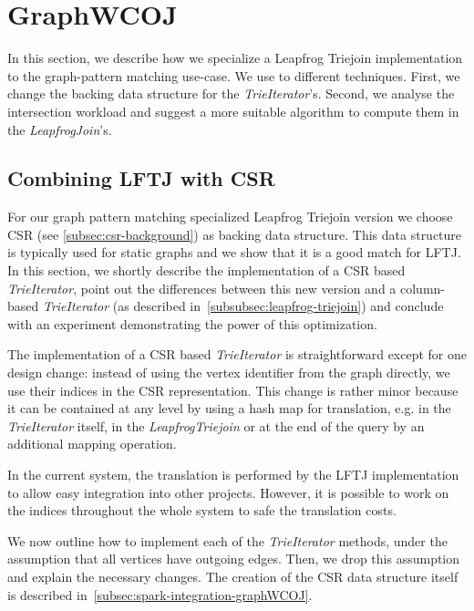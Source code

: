 \section{Graph\textsc{WCOJ}} \label{sec:graphwcoj}
In this section, we describe how we specialize a Leapfrog Triejoin implementation to
the graph-pattern matching use-case.
We use to different techniques.
First, we change the backing data structure for the \textit{TrieIterator}'s.
Second, we analyse the intersection workload and suggest a more suitable
algorithm to compute them in the \textit{LeapfrogJoin}'s.

\subsection{Combining \textsc{LFTJ} with \textsc{CSR}} \label{subsec:graphWCOJ-csr}
For our graph pattern matching specialized Leapfrog Triejoin version we choose \textsc{CSR} (see \cref{subsec:csr-background}) as
backing data structure.
This data structure is typically used for static graphs and we show that it is a good match for \textsc{LFTJ}.
In this section, we shortly describe the implementation of a \textsc{CSR} based \textit{TrieIterator}, point out the differences between
this new version and a column-based \textit{TrieIterator} (as described in~\cref{subsubsec:leapfrog-triejoin}) and conclude with an experiment demonstrating
the power of this optimization.

The implementation of a \textsc{CSR} based \textit{TrieIterator} is straightforward except for one design change: instead of using
the vertex identifier from the graph directly, we use their indices in the \textsc{CSR} representation.
This change is rather minor because it can be contained at any level by using a hash map for translation, e.g. in the
\textit{TrieIterator} itself, in the \textit{LeapfrogTriejoin} or at the end of the query by an additional mapping operation.

In the current system, the translation is performed by the \textsc{LFTJ} implementation to allow easy integration into other projects.
However, it is possible to work on the indices throughout the whole system to safe the translation costs.

We now outline how to implement each of the \textit{TrieIterator} methods, under the assumption that all vertices have outgoing edges.
Then, we drop this assumption and explain the necessary changes.
The creation of the \textsc{CSR} data structure itself is described in~\cref{subsec:spark-integration-graphWCOJ}.

